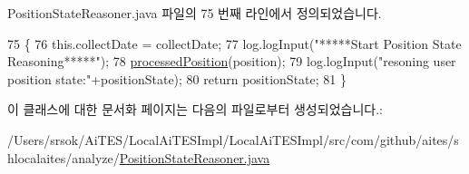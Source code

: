Position\+State\+Reasoner.\+java 파일의 75 번째 라인에서 정의되었습니다.


\begin{DoxyCode}
75                                                                     \{
76         this.collectDate = collectDate;
77         log.logInput(\textcolor{stringliteral}{"*****Start Position State Reasoning*****"});
78         \mbox{\hyperlink{classcom_1_1github_1_1aites_1_1shlocalaites_1_1analyze_1_1_position_state_reasoner_a2b79d5d0bf6a411556c17bf338d548ae}{processedPosition}}(position);
79         log.logInput(\textcolor{stringliteral}{"resoning user position state:"}+positionState);
80         \textcolor{keywordflow}{return} positionState;
81     \}
\end{DoxyCode}


이 클래스에 대한 문서화 페이지는 다음의 파일로부터 생성되었습니다.\+:\begin{DoxyCompactItemize}
\item 
/\+Users/srsok/\+Ai\+T\+E\+S/\+Local\+Ai\+T\+E\+S\+Impl/\+Local\+Ai\+T\+E\+S\+Impl/src/com/github/aites/shlocalaites/analyze/\mbox{\hyperlink{_position_state_reasoner_8java}{Position\+State\+Reasoner.\+java}}\end{DoxyCompactItemize}
